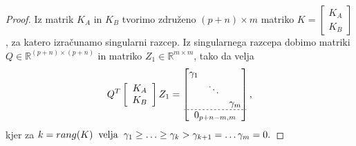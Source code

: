 \documentclass[mat1]{article}
\theoremstyle{definition}
\begin{document}
\begin{proof}

Iz matrik $K_A$ in $K_B$ tvorimo združeno $(p+n)\times m$ matriko $K = \left[\begin{array}{c} K_A \\ K_B \end{array}\right]$, za katero izračunamo singularni razcep. Iz singularnega razcepa dobimo matriki $Q \in \mathbb{R}^{(p+n) \times (p+n)}$ in matriko $Z_1 \in \mathbb{R}^{m \times m}$, tako da velja 
\begin{equation}
Q^T \left[\begin{array}{c} K_A \\ K_B \end{array}\right] Z_1 = 
\begin{bmatrix}
\begin{matrix}
\gamma_1 & & \\
 & \ddots & \\
 & & \gamma_m
\end{matrix} \\ \hdashline[2pt/2pt]
0_{p+n-m, m}
\end{bmatrix} 
\text{,}
\label{eq:1}
\end{equation}
kjer za
$
k = rang(K) \hspace{2mm} \text{velja} \hspace{2mm} 
\gamma_1 \geq \ldots \geq \gamma_k > \gamma_{k+1} = \ldots \gamma_m = 0\text{.} $


\end{proof}
\end{document}
